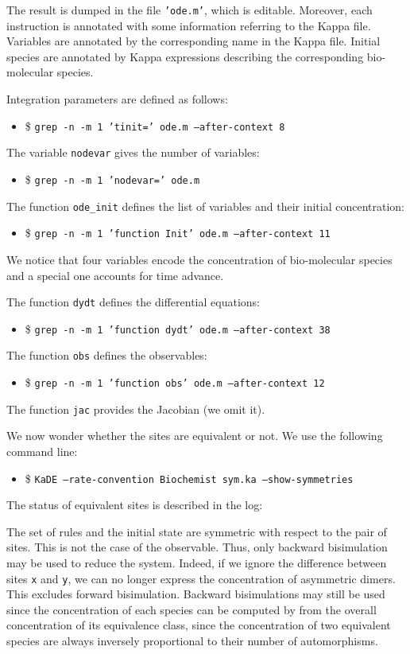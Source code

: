 \documentclass[11pt]{book}
\def\ttt#1{\texttt{#1}}
\def\ITE#1{\begin{itemize}#1\end{itemize}}
\begin{document}
The result is dumped in the file \texttt{'ode.m'}, which  is editable. Moreover, each instruction is annotated with some information referring to the Kappa file. Variables are annotated by the corresponding name in the Kappa file. Initial species are annotated by Kappa expressions describing the corresponding bio-molecular species.


\lstset{numbers=none}

Integration parameters are defined as follows:
\ITE{
\item[\$] \ttt{grep -n -m 1 'tinit=' ode.m --after-context 8}}


The variable \texttt{nodevar} gives the number of variables:
\ITE{
\item[\$] \ttt{grep -n -m 1 'nodevar=' ode.m}}


The function \texttt{ode\_init} defines the list of variables and their initial concentration:
\ITE{
\item[\$] \ttt{grep -n -m 1 'function Init' ode.m --after-context 11 }}

We notice that four variables encode the concentration of bio-molecular species and a special one accounts for time advance.

The function \texttt{dydt} defines the differential equations:
\ITE{
\item[\$] \ttt{grep -n -m 1 'function dydt' ode.m --after-context 38}}


The function \texttt{obs} defines the observables:
\ITE{
\item[\$] \ttt{grep -n -m 1 'function obs' ode.m --after-context 12}}


The function \texttt{jac} provides the Jacobian (we omit it).

We now wonder whether the sites are equivalent or not. We use the following command line:
\ITE{
\item[\$] \ttt{KaDE --rate-convention Biochemist sym.ka --show-symmetries}}
The status of equivalent sites is described in the log:


The set of rules and the initial state are symmetric with respect to the pair of sites. This is not the case of the observable. Thus, only backward bisimulation may be used to reduce the system. Indeed, if we ignore the difference between sites \texttt{x} and \texttt{y}, we can no longer express the concentration of asymmetric dimers. This  excludes forward bisimulation. Backward bisimulations may still be used since the concentration of each species can be computed by from the overall concentration of its equivalence class,  since the concentration of two equivalent species are always inversely proportional to their number of automorphisms.
\end{document}
